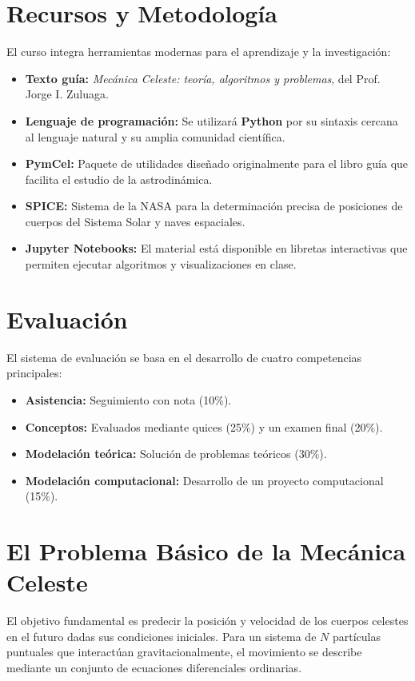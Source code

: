 \documentclass[a4paper]{article}
\begin{document}
\section{Recursos y Metodología}
El curso integra herramientas modernas para el aprendizaje y la investigación:
\begin{itemize}
    \item \textbf{Texto guía:} \textit{Mecánica Celeste: teoría, algoritmos y problemas}, del Prof. Jorge I. Zuluaga.
    \item \textbf{Lenguaje de programación:} Se utilizará \textbf{Python} por su sintaxis cercana al lenguaje natural y su amplia comunidad científica.
    \item \textbf{PymCel:} Paquete de utilidades diseñado originalmente para el libro guía que facilita el estudio de la astrodinámica.
    \item \textbf{SPICE:} Sistema de la NASA para la determinación precisa de posiciones de cuerpos del Sistema Solar y naves espaciales.
    \item \textbf{Jupyter Notebooks:} El material está disponible en libretas interactivas que permiten ejecutar algoritmos y visualizaciones en clase.
\end{itemize}

\section{Evaluación}
El sistema de evaluación se basa en el desarrollo de cuatro competencias principales:
\begin{itemize}
    \item \textbf{Asistencia:} Seguimiento con nota (10\%).
    \item \textbf{Conceptos:} Evaluados mediante quices (25\%) y un examen final (20\%).
    \item \textbf{Modelación teórica:} Solución de problemas teóricos (30\%).
    \item \textbf{Modelación computacional:} Desarrollo de un proyecto computacional (15\%).
\end{itemize}

\section{El Problema Básico de la Mecánica Celeste}
El objetivo fundamental es predecir la posición y velocidad de los cuerpos celestes en el futuro dadas sus condiciones iniciales. Para un sistema de $N$ partículas puntuales que interactúan gravitacionalmente, el movimiento se describe mediante un conjunto de ecuaciones diferenciales ordinarias.
\end{document}
